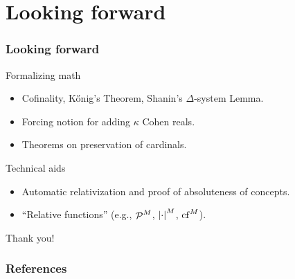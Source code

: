 \documentclass[english]{beamer}
\begin{document}
\section{Looking forward}

\begin{frame}
  \frametitle{Looking forward}
  \begin{block}{Formalizing math}
    \begin{itemize}
    \item Cofinality, K\H{o}nig's Theorem, Shanin's $\Delta$-system Lemma.
    \item Forcing notion for adding $\kappa$ Cohen reals.
    \item Theorems on preservation of cardinals.
    \end{itemize}
  \end{block}
  \pause
  \begin{block}{Technical aids}
    \begin{itemize}
    \item Automatic relativization and proof of absoluteness of concepts.
    \item ``Relative functions'' (e.g., $\P^M$, $\card{\cdot}^M$, $\cf^M$).
    \end{itemize}
  \end{block}
\end{frame}

\begin{frame}
  \begin{shadowblock}{}
    \begin{center}
      {\Huge Thank you!}
    \end{center}
  \end{shadowblock}
\end{frame}

\begin{frame}
  \frametitle{References}
  
  
\end{frame}
\end{document}
